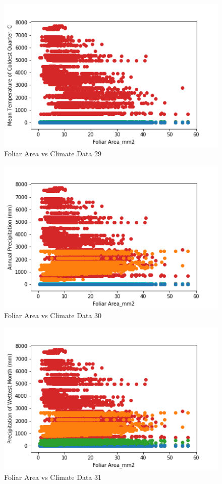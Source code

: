 \documentclass[letterpaper]{article}
\begin{document}
\begin{figure}[h]
\caption{Foliar Area vs Climate Data 29\label{fig:Foliar_Area_vs_29}}
\centering
\includegraphics[width=0.7\paperwidth]{Foliar_Area_vs_29}
\end{figure}


\begin{figure}[h]
\caption{Foliar Area vs Climate Data 30\label{fig:Foliar_Area_vs_30}}
\centering
\includegraphics[width=0.7\paperwidth]{Foliar_Area_vs_30}
\end{figure}


\begin{figure}[h]
\caption{Foliar Area vs Climate Data 31\label{fig:Foliar_Area_vs_31}}
\centering
\includegraphics[width=0.7\paperwidth]{Foliar_Area_vs_31}
\end{figure}
\end{document}
